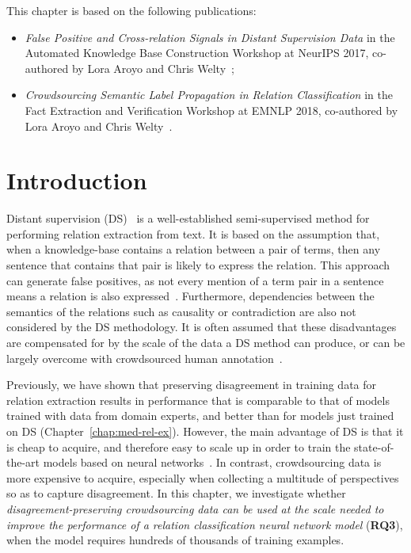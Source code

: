 This chapter is based on the following publications:

\begin{itemize}

\item \textit{False Positive and Cross-relation Signals in Distant Supervision Data} in the Automated Knowledge Base Construction Workshop at NeurIPS 2017, co-authored by Lora Aroyo and Chris Welty~\cite{dumitrache2017false};

\item \textit{Crowdsourcing Semantic Label Propagation in Relation Classification} in the Fact Extraction and Verification Workshop at EMNLP 2018, co-authored by Lora Aroyo and Chris Welty~\cite{dumitrache2018crowdsourcing}.

\end{itemize}

\section{Introduction}


Distant supervision (DS)~\cite{mintz2009distant,Welty:2010:LSR} is a well-established semi-supervised method for performing relation extraction from text. It is based on the assumption that, when a knowledge-base contains a relation between a pair of terms, then any sentence that contains that pair is likely to express the relation. This approach can generate false positives, as not every mention of a term pair in a sentence means a relation is also expressed~\cite{DBLP:conf/ijcai/FengGQLL17}. Furthermore, dependencies between the semantics of the relations such as causality or contradiction are also not considered by the DS methodology. It is often assumed that these disadvantages are compensated for by the scale of the data a DS method can produce, or can be largely overcome with crowdsourced human annotation~\cite{angeli2014combining,liu2016effective}.

Previously, we have shown that preserving disagreement in training data for relation extraction results in performance that is comparable to that of models trained with data from domain experts, and better than for models just trained on DS (Chapter~\ref{chap:med-rel-ex}). However, the main advantage of DS is that it is cheap to acquire, and therefore easy to scale up in order to train the state-of-the-art models based on neural networks~\cite{ji2017distant,zhou2016attention}. In contrast, crowdsourcing data is more expensive to acquire, especially when collecting a multitude of perspectives so as to capture disagreement. In this chapter, we investigate whether \textit{disagreement-preserving crowdsourcing data can be used at the scale needed to improve the performance of a relation classification neural network model} (\textbf{RQ3}), when the model requires hundreds of thousands of training examples.

